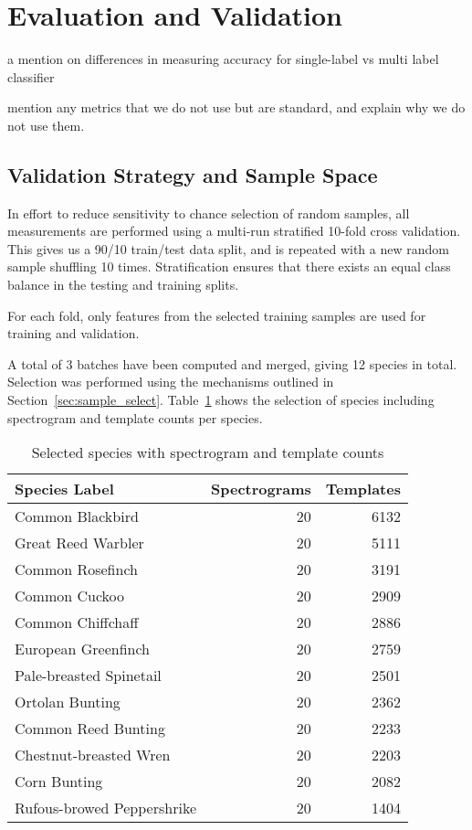 \section{ Evaluation and Validation}\label{sec:acc_eval}


a mention on differences in measuring accuracy for single-label vs multi
label classifier

mention any metrics that we do not use but are standard, and explain
why we do not use them.

\subsection{Validation Strategy and Sample Space}
In effort to reduce sensitivity to chance selection of random samples, all
measurements are performed using a multi-run stratified 10-fold cross validation.
This gives us a 90/10 train/test data split, and is repeated with a new random
sample shuffling 10 times.
Stratification ensures that there exists an equal class balance in the testing
and training splits.

For each fold, only features from the selected training samples are
used for training and validation.

A total of 3 batches have been computed and merged, giving 12 species in total.
Selection was performed using the mechanisms outlined in
Section~\ref{sec:sample_select}.
Table~\ref{tbl:used_data} shows the selection of species including spectrogram
and template counts per species.

\begin{table}[!htb]
  \caption{Selected species with spectrogram and template counts}
  \label{tbl:used_data}
  \centering
  \begin{tabular}{l r r}
    Species Label & Spectrograms & Templates \\ \hline
    Common Blackbird           & 20 & 6132\\
    Great Reed Warbler         & 20 & 5111\\
    Common Rosefinch           & 20 & 3191\\
    Common Cuckoo              & 20 & 2909\\
    Common Chiffchaff          & 20 & 2886\\
    European Greenfinch        & 20 & 2759\\
    Pale-breasted Spinetail    & 20 & 2501\\
    Ortolan Bunting            & 20 & 2362\\
    Common Reed Bunting        & 20 & 2233\\
    Chestnut-breasted Wren     & 20 & 2203\\
    Corn Bunting               & 20 & 2082\\
    Rufous-browed Peppershrike & 20 & 1404
  \end{tabular}
\end{table}

